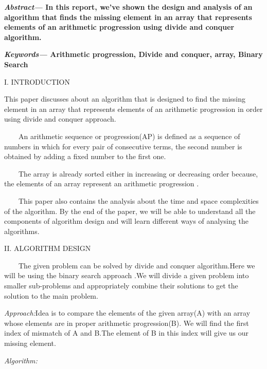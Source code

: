 \documentclass[12pt,a4paper]{article}
\begin{document}
\begin{multicols}{2}
\textbf{\textit{Abstract--- }In this report, we've shown the design and analysis of an algorithm that finds the missing element in an array that represents elements of an arithmetic progression using divide and conquer algorithm.}

\textbf{\textit{Keywords--- } Arithmetic progression, Divide and conquer, array, Binary Search }

\begin{center}I. INTRODUCTION\end{center}

This paper discusses about an algorithm that is  designed to  find the missing element in an array that represents elements of an arithmetic progression in order using divide and conquer approach.

\ \ \ \  An arithmetic sequence or progression(AP) is defined as a sequence of numbers in which for every pair of consecutive terms, the second number is obtained by adding a fixed number to the first one.

\ \ \ \ The array is already sorted either in increasing or decreasing order because, the elements of an array represent an arithmetic progression . 
 
\ \ \ \ This paper also contains the analysis about the time and space complexities of the algorithm. By the end of the paper, we will be able to understand all the components of algorithm design and will learn different ways of analysing the 
algorithms. 



\begin{center}II. ALGORITHM DESIGN\end{center}

\ \ \ \ The given problem can be solved by divide and conquer algorithm.Here we will be using the binary search approach .We will divide a given problem into smaller sub-problems and appropriately combine their solutions to get the solution to the main problem.  


\textit{  Approach:}Idea is to compare the elements of the given array(A) with an array whose elements are in proper arithmetic progression(B). We will find the first index of mismatch of A and B.The element of B in this index will give us our missing element.


\textit{  Algorithm:}


\end{multicols}
\end{document}
